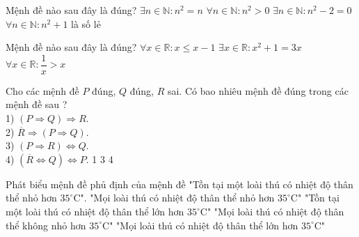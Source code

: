 \begin{ex}%
	Mệnh đề nào sau đây là đúng?
	\choice
	{\True $\exists n\in\mathbb{N}: n^2=n$}
	{$\forall n\in\mathbb{N}: n^2>0$}
	{$\exists n\in\mathbb{N}: n^2-2=0$}
	{$\forall n\in\mathbb{N}: n^2+1$ là số lẻ}
\end{ex}

\begin{ex}%
	Mệnh đề nào sau đây là đúng?
	{$\forall x\in\mathbb{R}: x\leq x-1$}		
	{\True $\exists x\in\mathbb{R}: x^2+1=3x$}
	{$\forall x\in\mathbb{R}: \dfrac{1}{x}>x$}
\end{ex}
\begin{ex}%
	Cho các mệnh đề $P$ đúng, $Q$ đúng, $R$ sai. Có bao nhiêu mệnh đề đúng trong các
	mệnh đề sau ?\\
	1) $(P \Rightarrow Q) \Rightarrow R$.\\
	2) $\overline{R} \Rightarrow (P\Rightarrow Q)$. \\
	3) $(P \Rightarrow R) \Leftrightarrow Q$. \\
	4) $(\overline{R} \Leftrightarrow  Q) \Leftrightarrow P$.
	\choice 
	{1}
	{}
	{3}
	{4}
\end{ex}

\begin{ex}%
	Phát biểu mệnh đề phủ định của mệnh đề "Tồn tại một loài thú có nhiệt độ thân thể nhỏ hơn $35^\circ$C".
	\choice 
	{"Mọi loài thú có nhiệt độ thân thể nhỏ hơn $35^\circ$C"}
	{"Tồn tại một loài thú có nhiệt độ thân thể lớn hơn $35^\circ$C"}
	{\True "Mọi loài thú có nhiệt độ thân thể không nhỏ  hơn $35^\circ$C"}
	{"Mọi loài thú có nhiệt độ thân thể lớn hơn $35^\circ$C"}
\end{ex}

